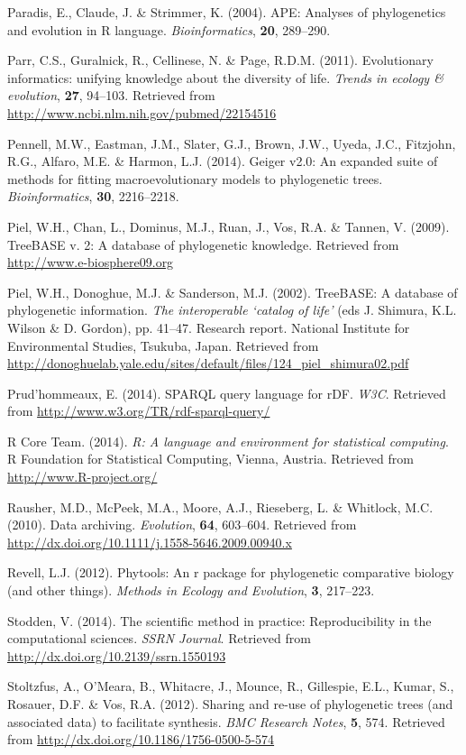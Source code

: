 \documentclass[author-year, review, 11pt]{components/elsarticle} %
\begin{document}
Paradis, E., Claude, J. \& Strimmer, K. (2004). APE: Analyses of
phylogenetics and evolution in R language. \emph{Bioinformatics},
\textbf{20}, 289--290.

Parr, C.S., Guralnick, R., Cellinese, N. \& Page, R.D.M. (2011).
Evolutionary informatics: unifying knowledge about the diversity of
life. \emph{Trends in ecology \& evolution}, \textbf{27}, 94--103.
Retrieved from \url{http://www.ncbi.nlm.nih.gov/pubmed/22154516}

Pennell, M.W., Eastman, J.M., Slater, G.J., Brown, J.W., Uyeda, J.C.,
Fitzjohn, R.G., Alfaro, M.E. \& Harmon, L.J. (2014). Geiger v2.0: An
expanded suite of methods for fitting macroevolutionary models to
phylogenetic trees. \emph{Bioinformatics}, \textbf{30}, 2216--2218.

Piel, W.H., Chan, L., Dominus, M.J., Ruan, J., Vos, R.A. \& Tannen, V.
(2009). TreeBASE v. 2: A database of phylogenetic knowledge. Retrieved
from \url{http://www.e-biosphere09.org}

Piel, W.H., Donoghue, M.J. \& Sanderson, M.J. (2002). TreeBASE: A
database of phylogenetic information. \emph{The interoperable `catalog
of life'} (eds J. Shimura, K.L. Wilson \& D. Gordon), pp. 41--47.
Research report. National Institute for Environmental Studies, Tsukuba,
Japan. Retrieved from
\url{http://donoghuelab.yale.edu/sites/default/files/124_piel_shimura02.pdf}

Prud'hommeaux, E. (2014). SPARQL query language for rDF. \emph{W3C}.
Retrieved from \url{http://www.w3.org/TR/rdf-sparql-query/}

R Core Team. (2014). \emph{R: A language and environment for statistical
computing}. R Foundation for Statistical Computing, Vienna, Austria.
Retrieved from \url{http://www.R-project.org/}

Rausher, M.D., McPeek, M.A., Moore, A.J., Rieseberg, L. \& Whitlock,
M.C. (2010). Data archiving. \emph{Evolution}, \textbf{64}, 603--604.
Retrieved from \url{http://dx.doi.org/10.1111/j.1558-5646.2009.00940.x}

Revell, L.J. (2012). Phytools: An r package for phylogenetic comparative
biology (and other things). \emph{Methods in Ecology and Evolution},
\textbf{3}, 217--223.

Stodden, V. (2014). The scientific method in practice: Reproducibility
in the computational sciences. \emph{SSRN Journal}. Retrieved from
\url{http://dx.doi.org/10.2139/ssrn.1550193}

Stoltzfus, A., O'Meara, B., Whitacre, J., Mounce, R., Gillespie, E.L.,
Kumar, S., Rosauer, D.F. \& Vos, R.A. (2012). Sharing and re-use of
phylogenetic trees (and associated data) to facilitate synthesis.
\emph{BMC Research Notes}, \textbf{5}, 574. Retrieved from
\url{http://dx.doi.org/10.1186/1756-0500-5-574}
\end{document}

